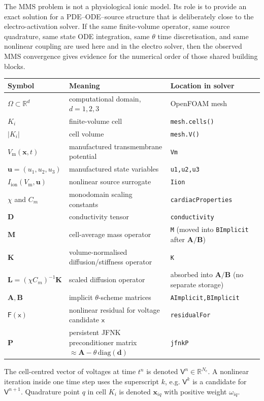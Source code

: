 \documentclass[11pt,a4paper]{article}
\newcommand{\code}[1]{\texttt{\small #1}}
\newcommand{\Vm}{V_{\text{m}}}
\newcommand{\Iion}{I_{\mathrm{ion}}}
\newcommand{\Dten}{\mathbf{D}}
\newcommand{\Mmass}{\mathbf{M}}
\newcommand{\Kstif}{\mathbf{K}}
\newcommand{\Lop}{\mathbf{L}}
\newcommand{\Aimp}{\mathbf{A}}
\newcommand{\Bimp}{\mathbf{B}}
\newcommand{\Fres}{\mathsf{F}}
\newcommand{\R}{\mathbb{R}}
\begin{document}
The MMS problem is not a physiological ionic model. Its role is to provide an
exact solution for a PDE--ODE--source structure that is deliberately close to
the electro-activation solver. If the same finite-volume operator, same source
quadrature, same state ODE integration, same $\theta$ time discretisation, and
same nonlinear coupling are used here and in the electro solver, then the
observed MMS convergence gives evidence for the numerical order of those shared
building blocks.

\begin{center}
\begin{tabular}{@{}lll@{}}
\toprule
Symbol & Meaning & Location in solver \\
\midrule
$\Omega\subset\R^d$ & computational domain, $d=1,2,3$ & OpenFOAM mesh \\
$K_i$ & finite-volume cell & \code{mesh.cells()} \\
$|K_i|$ & cell volume & \code{mesh.V()} \\
$\Vm(\mathbf{x},t)$ & manufactured transmembrane potential & \code{Vm} \\
$\mathbf{u}=(u_1,u_2,u_3)$ & manufactured state variables & \code{u1,u2,u3} \\
$\Iion(\Vm,\mathbf{u})$ & nonlinear source surrogate & \code{Iion} \\
$\chi$ and $C_m$ & monodomain scaling constants & \code{cardiacProperties} \\
$\Dten$ & conductivity tensor & \code{conductivity} \\
$\Mmass$ & cell-average mass operator & \code{M} (moved into \code{BImplicit} after $\Aimp/\Bimp$) \\
$\Kstif$ & volume-normalised diffusion/stiffness operator & \code{K} \\
$\Lop=(\chi C_m)^{-1}\Kstif$ & scaled diffusion operator & absorbed into $\Aimp/\Bimp$ (no separate storage) \\
$\Aimp,\Bimp$ & implicit $\theta$-scheme matrices & \code{AImplicit,BImplicit} \\
$\Fres(\mathsf{x})$ & nonlinear residual for voltage candidate $\mathsf{x}$ & \code{residualFor} \\
$\mathbf{P}$ & persistent JFNK preconditioner matrix $\approx\Aimp-\theta\,\mathrm{diag}(\mathbf{d})$ & \code{jfnkP} \\
\bottomrule
\end{tabular}
\end{center}

The cell-centred vector of voltages at time $t^n$ is denoted
$\mathsf{V}^n\in\R^{N_c}$. A nonlinear iteration inside one time step uses the
superscript $k$, e.g. $\mathsf{V}^k$ is a candidate for
$\mathsf{V}^{n+1}$. Quadrature point $q$ in cell $K_i$ is denoted
$\mathbf{x}_{iq}$ with positive weight $\omega_{iq}$.
\end{document}

